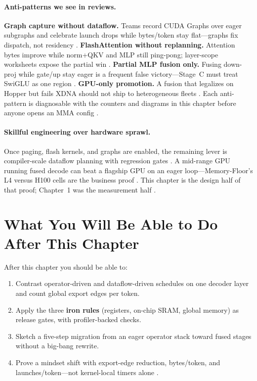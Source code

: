 \paragraph{Anti-patterns we see in reviews.}
\textbf{Graph capture without dataflow.} Teams record CUDA Graphs over eager subgraphs and celebrate launch drops while bytes/token stay flat---graphs fix dispatch, not residency \citep{nvidia2024cudagraphs,memoryfloor2026}.
\textbf{FlashAttention without replanning.} Attention bytes improve while norm+QKV and MLP still ping-pong; layer-scope worksheets expose the partial win \citep{dao2022flashattention,taxbreak2026}.
\textbf{Partial MLP fusion only.} Fusing down-proj while gate/up stay eager is a frequent false victory---Stage~C must treat SwiGLU as one region \citep{memoryfloor2026}.
\textbf{GPU-only promotion.} A fusion that legalizes on Hopper but fails XDNA should not ship to heterogeneous fleets \citep{amd2024xdna,yirage2026}.
Each anti-pattern is diagnosable with the counters and diagrams in this chapter before anyone opens an MMA config \citep{patel2025llminference}.

\paragraph{Skillful engineering over hardware sprawl.}
Once paging, flash kernels, and graphs are enabled, the remaining lever is compiler-scale dataflow planning with regression gates \citep{yirage2026,chen2020compilerbasedhardw,memoryfloor2026}.
A mid-range GPU running fused decode can beat a flagship GPU on an eager loop---Memory-Floor's L4 versus H100 cells are the business proof \citep{memoryfloor2026}.
This chapter is the design half of that proof; Chapter~1 was the measurement half \citep{taxbreak2026,patel2025llminference}.

\section{What You Will Be Able to Do After This Chapter}
\label{sec:chapter_goals}

After this chapter you should be able to:
\begin{enumerate}
\item Contrast operator-driven and dataflow-driven schedules on one decoder layer and count global export edges per token.
\item Apply the three \textbf{iron rules} (registers, on-chip SRAM, global memory) as release gates, with profiler-backed checks.
\item Sketch a five-step migration from an eager operator stack toward fused stages without a big-bang rewrite.
\item Prove a mindset shift with export-edge reduction, bytes/token, and launches/token---not kernel-local timers alone \citep{taxbreak2026,memoryfloor2026}.
\end{enumerate}

